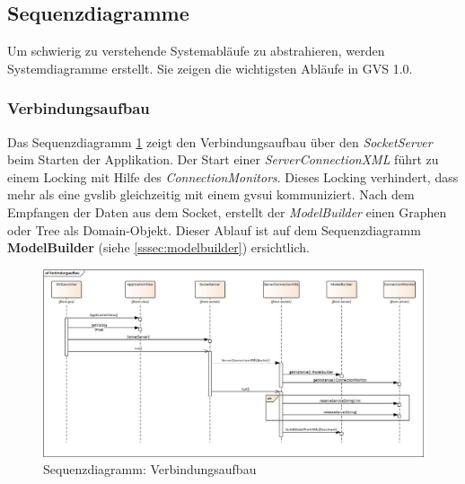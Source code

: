 \documentclass[11pt,a4paper,english,oneside]{book}
\numberwithin{equation}{chapter}
\begin{document}
	\subsection{Sequenzdiagramme} \label{ssec:sequence-1}
	Um schwierig zu verstehende Systemabläufe zu abstrahieren, werden Systemdiagramme erstellt. Sie zeigen die wichtigsten Abläufe in GVS 1.0.
	
	\subsubsection{Verbindungsaufbau}
	Das Sequenzdiagramm	\ref{fig:sd-verbindungsaufbau} zeigt den Verbindungsaufbau über den \textit{SocketServer} beim Starten der Applikation. Der Start einer \textit{ServerConnectionXML} führt zu einem Locking mit Hilfe des \textit{ConnectionMonitors}. Dieses Locking verhindert, dass mehr als eine \gls{gvslib} gleichzeitig mit einem \gls{gvsui} kommuniziert. Nach dem Empfangen der Daten aus dem Socket, erstellt der \textit{ModelBuilder} einen Graphen oder Tree als Domain-Objekt. Dieser Ablauf ist auf dem Sequenzdiagramm \textbf{ModelBuilder} (siehe \ref{sssec:modelbuilder}) ersichtlich.
	\begin{figure}[h!]
		\centering
		\includegraphics[width=\linewidth]{assets/images/verbindungsaufbau}
		\caption{Sequenzdiagramm: Verbindungsaufbau}
		\label{fig:sd-verbindungsaufbau}
	\end{figure}
\end{document}
